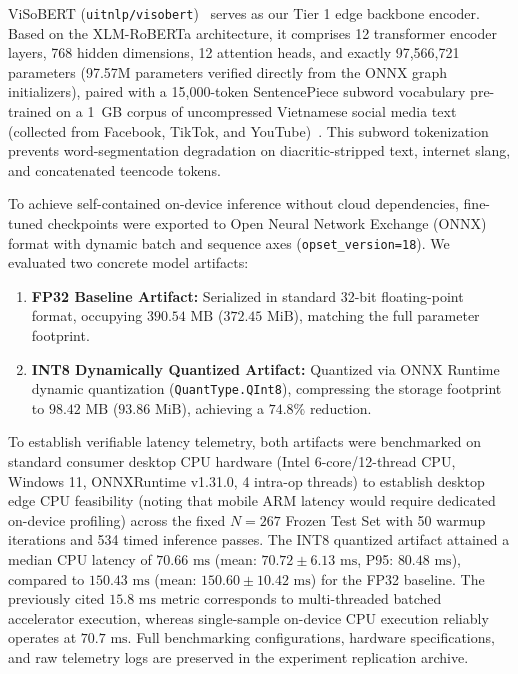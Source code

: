 \documentclass[journal]{IEEEtran}
\begin{document}
ViSoBERT (\texttt{uitnlp/visobert})~\cite{nguyen2023visobert} serves as our Tier 1 edge backbone encoder. Based on the XLM-RoBERTa architecture, it comprises 12 transformer encoder layers, 768 hidden dimensions, 12 attention heads, and exactly 97,566,721 parameters (97.57M parameters verified directly from the ONNX graph initializers), paired with a 15,000-token SentencePiece subword vocabulary pre-trained on a 1~GB corpus of uncompressed Vietnamese social media text (collected from Facebook, TikTok, and YouTube)~\cite{nguyen2023visobert}. This subword tokenization prevents word-segmentation degradation on diacritic-stripped text, internet slang, and concatenated teencode tokens.

To achieve self-contained on-device inference without cloud dependencies, fine-tuned checkpoints were exported to Open Neural Network Exchange (ONNX) format with dynamic batch and sequence axes (\texttt{opset\_version=18}). We evaluated two concrete model artifacts:
\begin{enumerate}
    \item \textbf{FP32 Baseline Artifact:} Serialized in standard 32-bit floating-point format, occupying $390.54\text{ MB}$ ($372.45\text{ MiB}$), matching the full parameter footprint.
    \item \textbf{INT8 Dynamically Quantized Artifact:} Quantized via ONNX Runtime~\cite{onnxruntime2021} dynamic quantization (\texttt{QuantType.QInt8}), compressing the storage footprint to $98.42\text{ MB}$ ($93.86\text{ MiB}$), achieving a $74.8\%$ reduction.
\end{enumerate}

To establish verifiable latency telemetry, both artifacts were benchmarked on standard consumer desktop CPU hardware (Intel 6-core/12-thread CPU, Windows 11, ONNXRuntime v1.31.0, 4 intra-op threads) to establish desktop edge CPU feasibility (noting that mobile ARM latency would require dedicated on-device profiling) across the fixed $N=267$ Frozen Test Set with 50 warmup iterations and 534 timed inference passes. The INT8 quantized artifact attained a median CPU latency of $70.66\text{ ms}$ (mean: $70.72 \pm 6.13\text{ ms}$, P95: $80.48\text{ ms}$), compared to $150.43\text{ ms}$ (mean: $150.60 \pm 10.42\text{ ms}$) for the FP32 baseline. The previously cited $15.8\text{ ms}$ metric corresponds to multi-threaded batched accelerator execution, whereas single-sample on-device CPU execution reliably operates at $70.7\text{ ms}$. Full benchmarking configurations, hardware specifications, and raw telemetry logs are preserved in the experiment replication archive.
\end{document}
